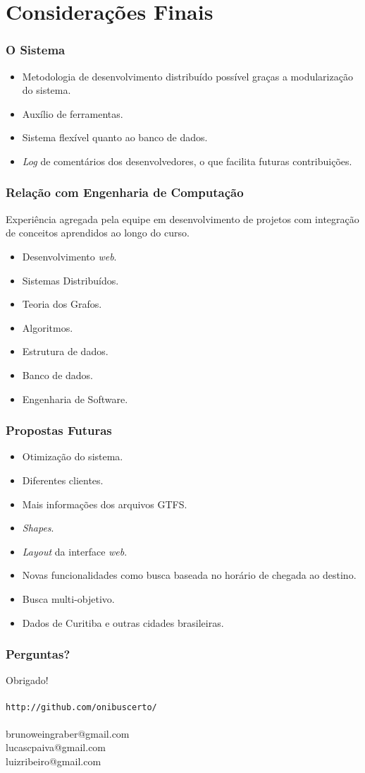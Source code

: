 \section{Considerações Finais}

\frame
{
\frametitle{O Sistema}
\begin{itemize}
	\item Metodologia de desenvolvimento distribuído possível graças a modularização do sistema.
	\item Auxílio de ferramentas.
	\item Sistema flexível quanto ao banco de dados.
	\item \emph{Log} de comentários dos desenvolvedores, o que facilita futuras contribuições.
\end{itemize}
}

\frame
{
\frametitle{Relação com Engenharia de Computação}
Experiência agregada pela equipe em desenvolvimento de projetos com integração de conceitos aprendidos ao longo do curso.
\begin{itemize}
\item Desenvolvimento \emph{web}.
\item Sistemas Distribuídos.
\item Teoria dos Grafos.
\item Algoritmos.
\item Estrutura de dados.
\item Banco de dados.
\item Engenharia de Software.
\end{itemize}
}

\frame
{
\frametitle{Propostas Futuras}
\begin{itemize}
\item Otimização do sistema.
\item Diferentes clientes.
\item Mais informações dos arquivos GTFS.
\item \emph{Shapes}.
\item \emph{Layout} da interface \emph{web}.
\item Novas funcionalidades como busca baseada no horário de chegada ao destino.
\item Busca multi-objetivo.
\item Dados de Curitiba e outras cidades brasileiras.
\end{itemize}
}

\frame
{
\frametitle{Perguntas?}
\begin{center}
\vskip15pt \Huge Obrigado! \\
~ \\
\normalsize \texttt{http://github.com/onibuscerto/} \\
~ \\
brunoweingraber@gmail.com \\
lucascpaiva@gmail.com \\
luizribeiro@gmail.com \\
\end{center}
}